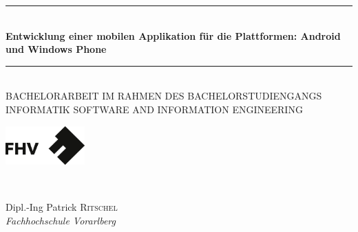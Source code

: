 
\begin{titlepage}




\begin{center}


\newcommand{\HRule}{\rule{\linewidth}{0.5mm}}
\HRule \\[0.4cm]
{ \huge \bfseries Entwicklung einer mobilen Applikation für die Plattformen: Android und Windows Phone}\\ [0.4cm]%
\HRule \\[1cm]

\textsc{\large BACHELORARBEIT IM RAHMEN DES
BACHELORSTUDIENGANGS INFORMATIK
SOFTWARE AND INFORMATION ENGINEERING}\\[3cm]



\begin{minipage}{0.48\textwidth}
\begin{center} 
\includegraphics[height=1.5cm]{./img/FHVlogo1}
\end{center}
\end{minipage}
\hfill\\ [0.2cm]



\begin{minipage}{0.48\textwidth}
\begin{center} \large

Dipl.-Ing Patrick \textsc{Ritschel} \\ %
\emph{Fachhochschule Vorarlberg}


\end{center}
\end{minipage}
\end{center}
\end{titlepage}
